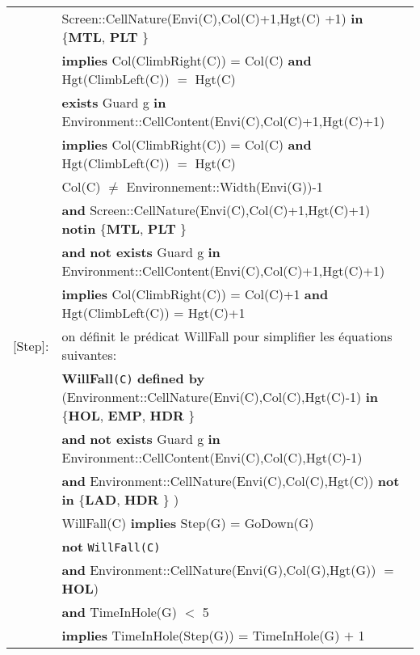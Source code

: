 \documentclass[8pt]{article}
\begin{document}
{\begin{longtable}{rl}
  & \textrm{Screen::CellNature(Envi(C),Col(C)+1,Hgt(C) +1)} \textbf{in} \{\textbf{MTL}, \textbf{PLT} \} \\ & \quad\quad \textbf{implies} \textrm{Col(ClimbRight(C))} = \textrm{Col(C)} \textbf{and} \textrm{Hgt(ClimbLeft(C))} $=$ \textrm{Hgt(C)} \\
  & \textbf{exists} \textrm{Guard} g \textbf{in} \textrm{Environment::CellContent(Envi(C),Col(C)+1,Hgt(C)+1)} \\
  & \quad\quad \textbf{implies} \textrm{Col(ClimbRight(C))} = \textrm{Col(C)} \textbf{and} \textrm{Hgt(ClimbLeft(C))} $=$ \textrm{Hgt(C)} \\
  & \textrm{Col(C)} $\neq$ Environnement::Width(Envi(G))-1 \\
  & \quad\quad \textbf{and} \textrm{Screen::CellNature(Envi(C),Col(C)+1,Hgt(C)+1)} \textbf{notin} \{\textbf{MTL}, \textbf{PLT} \} \\
  & \quad\quad \textbf{and} \textbf{not exists} \textrm{Guard} g \textbf{in} \textrm{Environment::CellContent(Envi(C),Col(C)+1,Hgt(C)+1)} \\
  & \quad\quad \textbf{implies} \textrm{Col(ClimbRight(C))} = \textrm{Col(C)}+1 \textbf{and} \textrm{Hgt(ClimbLeft(C))} = \textrm{Hgt(C)}+1 \\
  \textrm{[Step]}:
  & on définit le prédicat WillFall pour simplifier les équations suivantes: \\
  & \textbf{WillFall}\texttt{(C)} \textbf{defined by} (\textrm{Environment::CellNature(Envi(C),Col(C),Hgt(C)-1)} \textbf{in} \{\textbf{HOL}, \textbf{EMP}, \textbf{HDR} \}  \\
  & \quad\quad\quad\quad\quad\quad\quad\quad\quad\quad \textbf{and} \textbf{not exists} \textrm{Guard} g \textbf{in} \textrm{Environment::CellContent(Envi(C),Col(C),Hgt(C)-1)} \\
  & \quad\quad\quad\quad\quad\quad\quad\quad\quad\quad \textbf{and} \textrm{Environment::CellNature(Envi(C),Col(C),Hgt(C))} \textbf{not in} \{\textbf{LAD}, \textbf{HDR} \} ) \\
  & \textrm{WillFall(C)} \textbf{implies} \textrm{Step(G)} = \textrm{GoDown(G)} \\
  & \textbf{not} \texttt{WillFall(C)} \\
  & \quad\quad \textbf{and} \textrm{Environment::CellNature(Envi(G),Col(G),Hgt(G))} $=$ \textbf{HOL}) \\
  & \quad\quad \textbf{and} \textrm{TimeInHole(G)} $<$ 5 \\
  & \quad\quad \textbf{implies} \textrm{TimeInHole(Step(G))} = \textrm{TimeInHole(G)} $+$ 1 \\

\end{longtable}}
\end{document}

